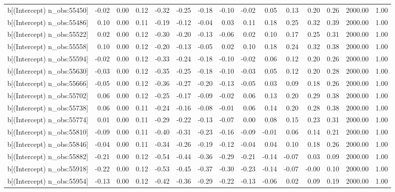 \begin{table}[ht]
\begin{tabular}{rrrrrrrrrrrrrrr}
  b[(Intercept) n\_obs:55450] & -0.02 & 0.00 & 0.12 & -0.32 & -0.25 & -0.18 & -0.10 & -0.02 & 0.05 & 0.13 & 0.20 & 0.26 & 2000.00 & 1.00 \\ 
  b[(Intercept) n\_obs:55486] & 0.10 & 0.00 & 0.11 & -0.19 & -0.12 & -0.04 & 0.03 & 0.11 & 0.18 & 0.25 & 0.32 & 0.39 & 2000.00 & 1.00 \\ 
  b[(Intercept) n\_obs:55522] & 0.02 & 0.00 & 0.12 & -0.30 & -0.20 & -0.13 & -0.06 & 0.02 & 0.10 & 0.17 & 0.25 & 0.31 & 2000.00 & 1.00 \\ 
  b[(Intercept) n\_obs:55558] & 0.10 & 0.00 & 0.12 & -0.20 & -0.13 & -0.05 & 0.02 & 0.10 & 0.18 & 0.24 & 0.32 & 0.38 & 2000.00 & 1.00 \\ 
  b[(Intercept) n\_obs:55594] & -0.02 & 0.00 & 0.12 & -0.33 & -0.24 & -0.18 & -0.10 & -0.02 & 0.06 & 0.12 & 0.20 & 0.26 & 2000.00 & 1.00 \\ 
  b[(Intercept) n\_obs:55630] & -0.03 & 0.00 & 0.12 & -0.35 & -0.25 & -0.18 & -0.10 & -0.03 & 0.05 & 0.12 & 0.20 & 0.28 & 2000.00 & 1.00 \\ 
  b[(Intercept) n\_obs:55666] & -0.05 & 0.00 & 0.12 & -0.36 & -0.27 & -0.20 & -0.13 & -0.05 & 0.03 & 0.09 & 0.18 & 0.26 & 2000.00 & 1.00 \\ 
  b[(Intercept) n\_obs:55702] & 0.06 & 0.00 & 0.12 & -0.25 & -0.17 & -0.09 & -0.02 & 0.06 & 0.13 & 0.20 & 0.29 & 0.38 & 2000.00 & 1.00 \\ 
  b[(Intercept) n\_obs:55738] & 0.06 & 0.00 & 0.11 & -0.24 & -0.16 & -0.08 & -0.01 & 0.06 & 0.14 & 0.20 & 0.28 & 0.38 & 2000.00 & 1.00 \\ 
  b[(Intercept) n\_obs:55774] & 0.01 & 0.00 & 0.11 & -0.29 & -0.22 & -0.13 & -0.07 & 0.00 & 0.08 & 0.15 & 0.23 & 0.31 & 2000.00 & 1.00 \\ 
  b[(Intercept) n\_obs:55810] & -0.09 & 0.00 & 0.11 & -0.40 & -0.31 & -0.23 & -0.16 & -0.09 & -0.01 & 0.06 & 0.14 & 0.21 & 2000.00 & 1.00 \\ 
  b[(Intercept) n\_obs:55846] & -0.04 & 0.00 & 0.11 & -0.34 & -0.26 & -0.19 & -0.12 & -0.04 & 0.04 & 0.10 & 0.18 & 0.26 & 2000.00 & 1.00 \\ 
  b[(Intercept) n\_obs:55882] & -0.21 & 0.00 & 0.12 & -0.54 & -0.44 & -0.36 & -0.29 & -0.21 & -0.14 & -0.07 & 0.03 & 0.09 & 2000.00 & 1.00 \\ 
  b[(Intercept) n\_obs:55918] & -0.22 & 0.00 & 0.12 & -0.53 & -0.45 & -0.37 & -0.30 & -0.23 & -0.14 & -0.07 & -0.00 & 0.10 & 2000.00 & 1.00 \\ 
  b[(Intercept) n\_obs:55954] & -0.13 & 0.00 & 0.12 & -0.42 & -0.36 & -0.29 & -0.22 & -0.13 & -0.06 & 0.02 & 0.09 & 0.19 & 2000.00 & 1.00 \\ 

\end{tabular}
\end{table}
